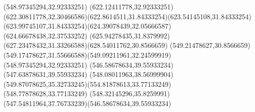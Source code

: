{{	\closepath
	\moveto(548.97345294,32.92333251)
	\lineto(622.12411778,32.92333251)
	\curveto(622.30811778,32.30466586)(622.8614511,31.84333254)(623.54145108,31.84333254)
	\curveto(623.99745107,31.84333254)(624.39078439,32.05666587)(624.66678438,32.37533252)
	\curveto(625.94278435,31.8379992)(627.23478432,31.33266588)(628.54011762,30.8566659)
	\lineto(549.21478627,30.8566659)
	\curveto(549.17478627,31.55666588)(549.09211961,32.24599919)(548.97345294,32.92333251)
	\moveto(546.58678634,39.55933234)
	\lineto(547.63878631,39.55933234)
	\curveto(548.08011963,38.56999904)(549.87078625,35.32733245)(554.81878613,33.77133249)
	\lineto(548.77878628,33.77133249)
	\curveto(548.32145296,35.8259991)(547.54811964,37.76733239)(546.58678634,39.55933234)
}
}
{
}
{
}
